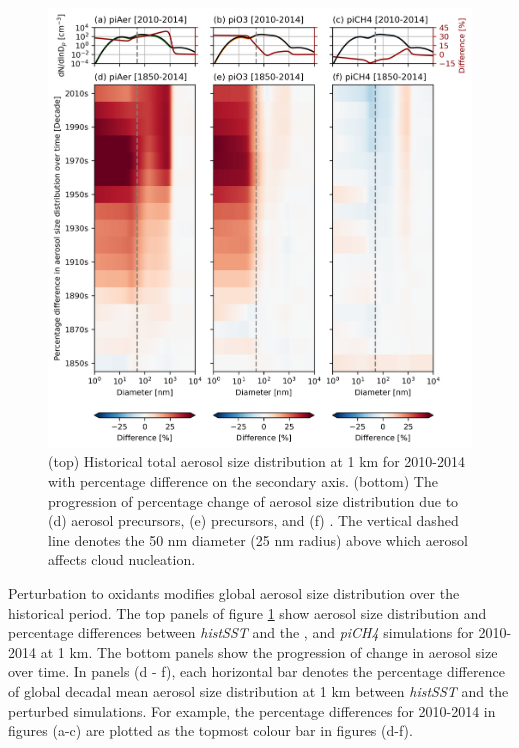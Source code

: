 \begin{figure}
    \centering
    \includegraphics[width=\linewidth]{Chapter3/Figs/f08_aerosol-size-dist-over-time.png}
    \caption[Aerosol size distribution for 2010-2014 at 1 km]{(top) Historical total aerosol size distribution at 1 km for 2010-2014 with percentage difference on the secondary axis. (bottom) The progression of percentage change of aerosol size distribution due to (d) aerosol precursors, (e)  precursors, and (f) . The vertical dashed line denotes the 50 nm diameter (25 nm radius) above which aerosol affects cloud nucleation.}
    \label{fig:ch3:aerosol-size-dist-time}
\end{figure}


Perturbation to oxidants modifies global aerosol size distribution over the historical period. The top panels of figure \ref{fig:ch3:aerosol-size-dist-time} show aerosol size distribution and percentage differences between \textit{histSST} and the \sstpiaer{}, \sstpio{} and \textit{piCH4} simulations for 2010-2014 at 1 km. The bottom panels show the progression of change in aerosol size over time. In panels (d - f), each horizontal bar denotes the percentage difference of global decadal mean aerosol size distribution at 1 km between \textit{histSST} and the perturbed simulations. For example, the percentage differences for 2010-2014 in figures (a-c) are plotted as the topmost colour bar in figures (d-f). 

